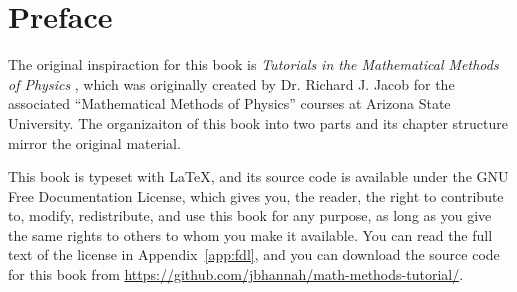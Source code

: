 \chapter{Preface}

The original inspiraction for this book is \textit{Tutorials in the
Mathematical Methods of Physics} \cite{rjjacob}, which was originally created
by Dr. Richard J. Jacob for the associated ``Mathematical Methods of Physics''
courses at Arizona State University. The organizaiton of this book into two
parts and its chapter structure mirror the original material.

This book is typeset with \LaTeX, and its source code is available under the
GNU Free Documentation License, which gives you, the reader, the right to
contribute to, modify, redistribute, and use this book for any purpose, as long
as you give the same rights to others to whom you make it available. You can
read the full text of the license in Appendix~\ref{app:fdl}, and you can
download the source code for this book from
\url{https://github.com/jbhannah/math-methods-tutorial/}.
